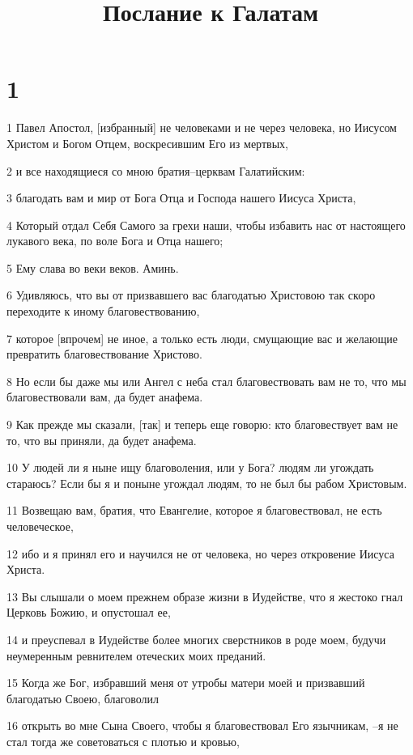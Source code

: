 

\title{Послание к Галатам}


\chapter{1}

\par 1 Павел Апостол, [избранный] не человеками и не через человека, но Иисусом Христом и Богом Отцем, воскресившим Его из мертвых,
\par 2 и все находящиеся со мною братия--церквам Галатийским:
\par 3 благодать вам и мир от Бога Отца и Господа нашего Иисуса Христа,
\par 4 Который отдал Себя Самого за грехи наши, чтобы избавить нас от настоящего лукавого века, по воле Бога и Отца нашего;
\par 5 Ему слава во веки веков. Аминь.
\par 6 Удивляюсь, что вы от призвавшего вас благодатью Христовою так скоро переходите к иному благовествованию,
\par 7 которое [впрочем] не иное, а только есть люди, смущающие вас и желающие превратить благовествование Христово.
\par 8 Но если бы даже мы или Ангел с неба стал благовествовать вам не то, что мы благовествовали вам, да будет анафема.
\par 9 Как прежде мы сказали, [так] и теперь еще говорю: кто благовествует вам не то, что вы приняли, да будет анафема.
\par 10 У людей ли я ныне ищу благоволения, или у Бога? людям ли угождать стараюсь? Если бы я и поныне угождал людям, то не был бы рабом Христовым.
\par 11 Возвещаю вам, братия, что Евангелие, которое я благовествовал, не есть человеческое,
\par 12 ибо и я принял его и научился не от человека, но через откровение Иисуса Христа.
\par 13 Вы слышали о моем прежнем образе жизни в Иудействе, что я жестоко гнал Церковь Божию, и опустошал ее,
\par 14 и преуспевал в Иудействе более многих сверстников в роде моем, будучи неумеренным ревнителем отеческих моих преданий.
\par 15 Когда же Бог, избравший меня от утробы матери моей и призвавший благодатью Своею, благоволил
\par 16 открыть во мне Сына Своего, чтобы я благовествовал Его язычникам, --я не стал тогда же советоваться с плотью и кровью,
